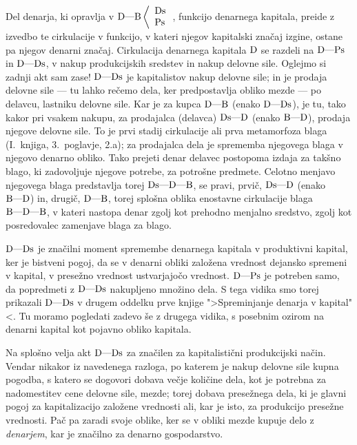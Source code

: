 \documentclass[kapital_02.tex]{subfiles}
\begin{document}
Del denarja, ki opravlja v \( 
    \textrm{D}\textrm{---}\textrm{B}\left< 
    \begin{array}{l}
        \textrm{Ds}\\
        \textrm{Ps}\\
    \end{array}
    \right. 
\), funkcijo denarnega kapitala, preide z izvedbo te cirkulacije v funkcijo, v kateri njegov kapitalski značaj izgine, ostane pa njegov denarni značaj. Cirkulacija denarnega kapitala \( \textrm{D} \) se razdeli na \( \textrm{D}\textrm{---}\textrm{Ps} \) in \( \textrm{D}\textrm{---}\textrm{Ds} \), v nakup produkcijskih sredstev in nakup delovne sile. Oglejmo si zadnji akt sam zase! \( \textrm{D}\textrm{---}\textrm{Ds} \) je kapitalistov nakup delovne sile; in je prodaja delovne sile --- tu lahko rečemo dela, ker predpostavlja obliko mezde --- po delavcu, lastniku delovne sile. Kar je za kupca \( \textrm{D}\textrm{---}\textrm{B} \) (enako \( \textrm{D}\textrm{---}\textrm{Ds} \)), je tu, tako kakor pri vsakem nakupu, za prodajalca (delavca) \( \textrm{Ds}\textrm{---}\textrm{D} \) (enako \( \textrm{B}\textrm{---}\textrm{D} \)), prodaja njegove delovne sile. To je prvi stadij cirkulacije ali prva metamorfoza blaga (I.~knjiga, 3.~poglavje, 2.a); za prodajalca dela je sprememba njegovega blaga v njegovo denarno obliko. Tako prejeti denar delavec postopoma izdaja za takšno blago, ki zadovoljuje njegove potrebe, za potrošne predmete. Celotno menjavo njegovega blaga predstavlja torej \( \textrm{Ds}\textrm{---}\textrm{D}\textrm{---}\textrm{B} \), se pravi, prvič, \( \textrm{Ds}\textrm{---}\textrm{D} \) (enako \( \textrm{B}\textrm{---}\textrm{D} \)) in, drugič, \( \textrm{D}\textrm{---}\textrm{B} \), torej splošna oblika enostavne cirkulacije blaga \( \textrm{B}\textrm{---}\textrm{D}\textrm{---}\textrm{B} \), v kateri nastopa denar zgolj kot prehodno menjalno sredstvo, zgolj kot posredovalec zamenjave blaga za blago.

\( \textrm{D}\textrm{---}\textrm{Ds} \) je značilni moment spremembe denarnega kapitala v produktivni kapital, ker je bistveni pogoj, da se v denarni obliki založena vrednost dejansko spremeni v kapital, v presežno vrednost ustvarjajočo vrednost. \( \textrm{D}\textrm{---}\textrm{Ps} \) je potreben samo, da popredmeti z \( \textrm{D}\textrm{---}\textrm{Ds} \) nakupljeno množino dela. S tega vidika smo torej prikazali \( \textrm{D}\textrm{---}\textrm{Ds} \) v drugem oddelku prve knjige ">Spreminjanje denarja v kapital"<. Tu moramo pogledati zadevo še z drugega vidika, s posebnim ozirom na denarni kapital kot pojavno obliko kapitala.

Na splošno velja akt \( \textrm{D}\textrm{---}\textrm{Ds} \) za značilen za kapitalistični produkcijski način. Vendar nikakor iz navedenega razloga, po katerem je nakup delovne sile kupna pogodba, s katero se dogovori dobava večje količine dela, kot je potrebna za nadomestitev cene delovne sile, mezde; torej dobava presežnega dela, ki je glavni pogoj za kapitalizacijo založene vrednosti ali, kar je isto, za produkcijo presežne vrednosti. Pač pa zaradi svoje oblike, ker se v obliki mezde kupuje delo z \emph{denarjem}, kar je značilno za denarno gospodarstvo.
\end{document}
